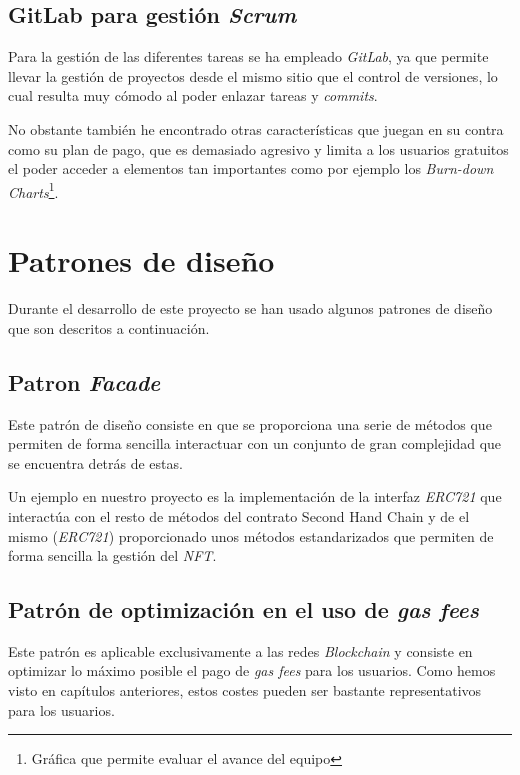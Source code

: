 \subsection{GitLab para gestión \textit{Scrum}}
Para la gestión de las diferentes tareas se ha empleado \textit{GitLab}, ya que permite llevar la gestión de proyectos desde el mismo sitio que el control de versiones, lo cual resulta muy cómodo al poder enlazar tareas y \textit{commits}.

No obstante también he encontrado otras características que juegan en su contra como su plan de pago, que es demasiado agresivo y limita a los usuarios gratuitos el poder acceder a elementos tan importantes como por ejemplo los \textit{Burn-down Charts}\footnote{Gráfica que permite evaluar el avance del equipo}.

\section{Patrones de diseño}

Durante el desarrollo de este proyecto se han usado algunos patrones de diseño que son descritos a continuación.

\subsection{Patron \textit{Facade}}

Este patrón de diseño \cite{schmidt1999wrapper} consiste en que se proporciona una serie de métodos que permiten de forma sencilla interactuar con un conjunto de gran complejidad que se encuentra detrás de estas.

Un ejemplo en nuestro proyecto es la implementación de la interfaz \textit{ERC721} que interactúa con el resto de métodos del contrato Second Hand Chain y de el mismo (\textit{ERC721}) proporcionado unos métodos estandarizados que permiten de forma sencilla la gestión del \textit{NFT}.

\subsection{Patrón de optimización en el uso de \textit{gas fees}}
Este patrón es aplicable exclusivamente a las redes \textit{Blockchain} y consiste en optimizar lo máximo posible el pago de \textit{gas fees} para los usuarios. Como hemos visto en capítulos anteriores, estos costes pueden ser bastante representativos para los usuarios.


